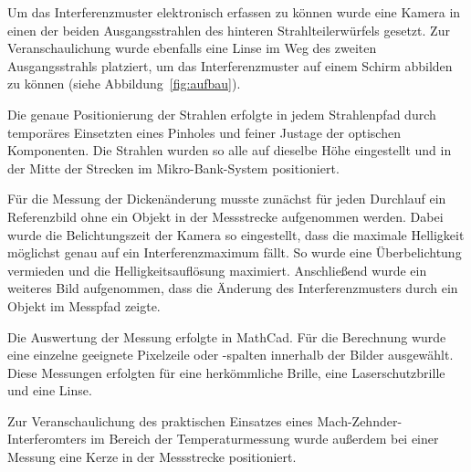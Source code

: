 Um das Interferenzmuster elektronisch erfassen zu können wurde eine Kamera in einen der beiden Ausgangsstrahlen des hinteren Strahlteilerwürfels gesetzt. Zur Veranschaulichung wurde ebenfalls eine Linse im Weg des zweiten Ausgangsstrahls platziert, um das Interferenzmuster auf einem Schirm abbilden zu können (siehe Abbildung~\ref{fig:aufbau}).

Die genaue Positionierung der Strahlen erfolgte in jedem Strahlenpfad durch temporäres Einsetzten eines Pinholes und feiner Justage der optischen Komponenten. Die Strahlen wurden so alle auf dieselbe Höhe eingestellt und in der Mitte der Strecken im Mikro-Bank-System positioniert.

Für die Messung der Dickenänderung musste zunächst für jeden Durchlauf ein Referenzbild ohne ein Objekt in der Messstrecke aufgenommen werden. Dabei wurde die Belichtungszeit der Kamera so eingestellt, dass die maximale Helligkeit möglichst genau auf ein Interferenzmaximum fällt. So wurde eine Überbelichtung vermieden und die Helligkeitsauflösung maximiert. Anschließend wurde ein weiteres Bild aufgenommen, dass die Änderung des Interferenzmusters durch ein Objekt im Messpfad zeigte. 

Die Auswertung der Messung erfolgte in MathCad. Für die Berechnung wurde eine einzelne geeignete Pixelzeile oder -spalten innerhalb der Bilder ausgewählt. Diese Messungen erfolgten für eine herkömmliche Brille, eine Laserschutzbrille und eine Linse.

Zur Veranschaulichung des praktischen Einsatzes eines Mach-Zehnder-Interferomters im Bereich der Temperaturmessung wurde außerdem bei einer Messung eine Kerze in der Messstrecke positioniert.